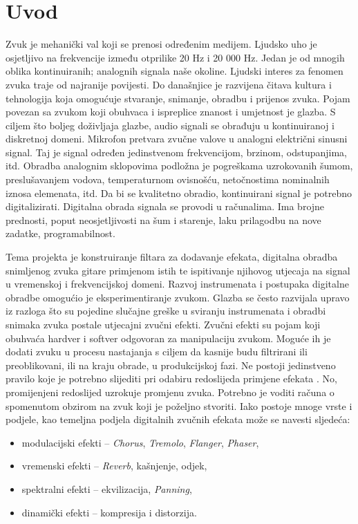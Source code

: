 \documentclass[conference]{IEEEtran}
\begin{document}
\section{Uvod}
Zvuk je mehanički val koji se prenosi određenim medijem. Ljudsko uho je osjetljivo na
frekvencije između otprilike 20 Hz i 20 000 Hz. Jedan je od mnogih oblika kontinuiranih;
analognih signala naše okoline. Ljudski interes za fenomen zvuka traje od najranije povijesti. Do
današnjice je razvijena čitava kultura i tehnologija koja omogućuje stvaranje, snimanje, obradbu
i prijenos zvuka. Pojam povezan sa zvukom koji obuhvaca i ispreplice znanost i umjetnost je glazba.
S ciljem što boljeg doživljaja glazbe, audio signali se obrađuju u kontinuiranoj i
diskretnoj domeni. Mikrofon pretvara zvučne valove u analogni električni sinusni signal. Taj je
signal određen jedinstvenom frekvencijom, brzinom, odstupanjima, itd. Obradba analognim
sklopovima podložna je pogreškama uzrokovanih šumom, preslušavanjem vodova,
temperaturnom ovisnošću, netočnostima nominalnih iznosa elemenata, itd. Da bi se kvalitetno
obradio, kontinuirani signal je potrebno digitalizirati. Digitalna obrada signala se provodi u
računalima. Ima brojne prednosti, poput neosjetljivosti na šum i starenje, laku prilagodbu na
nove zadatke, programabilnost.

Tema projekta je konstruiranje filtara za dodavanje efekata, digitalna obradba snimljenog zvuka
gitare primjenom istih te ispitivanje njihovog utjecaja na signal u vremenskoj i frekvencijskoj
domeni. Razvoj instrumenata i postupaka digitalne obradbe omogućio je eksperimentiranje
zvukom. Glazba se često razvijala upravo iz razloga što su pojedine slučajne greške u sviranju
instrumenata i obradbi snimaka zvuka postale utjecajni zvučni efekti. Zvučni efekti su pojam koji
obuhvaća hardver i softver odgovoran za manipulaciju zvukom. Moguće ih je dodati zvuku u
procesu nastajanja s ciljem da kasnije budu filtrirani ili preoblikovani, ili
na kraju obrade, u produkcijskoj fazi. Ne postoji jedinstveno pravilo koje je potrebno slijediti pri
odabiru redoslijeda primjene efekata \citep{b1}. No, promijenjeni redoslijed uzrokuje promjenu zvuka.
Potrebno je voditi računa o spomenutom obzirom na zvuk koji je poželjno stvoriti. Iako postoje
mnoge vrste i podjele, kao temeljna podjela digitalnih zvučnih efekata
može se navesti sljedeća:

\begin{itemize}
	\item{modulacijski efekti – \textit{Chorus}, \textit{Tremolo}, \textit{Flanger}, \textit{Phaser},}
	\item{vremenski efekti – \textit{Reverb}, kašnjenje, odjek,}
	\item{spektralni efekti – ekvilizacija, \textit{Panning},}
	\item{dinamički efekti – kompresija i distorzija.}
\end{itemize}
\end{document}
